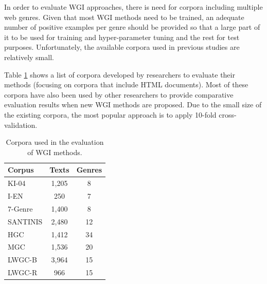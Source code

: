 In order to evaluate WGI approaches, there is need for corpora including multiple web genres. Given that most WGI methods need to be trained, an adequate number of positive examples per genre should be provided so that a large part of it to be used for training and hyper-parameter tuning and the rest for test purposes. Unfortunately, the available corpora used in previous studies are relatively small. 

Table \ref{table:corpora} shows a list of corpora developed by researchers to evaluate their methods (focusing on corpora that include HTML documents). Most of these corpora have also been used by other researchers to provide comparative evaluation results when new WGI methods are proposed. Due to the small size of the existing corpora, the most popular approach is to apply 10-fold cross-validation.

\begin{table}[t]
	\center
	\caption {Corpora used in the evaluation of WGI methods.}
	\label{table:corpora}
	\begin{tabular}{lcc}
		\hline
		Corpus & Texts & Genres \\
		\hline
        KI-04 & 1,205 & 8 \\
        I-EN & 250 & 7 \\
        7-Genre & 1,400 & 8 \\
        SANTINIS & 2,480 & 12 \\
        HGC & 1,412 & 34 \\
        MGC & 1,536 & 20 \\
        LWGC-B & 3,964 & 15 \\
        LWGC-R & 966 & 15 \\
  		\hline
	\end{tabular}
\end{table}

